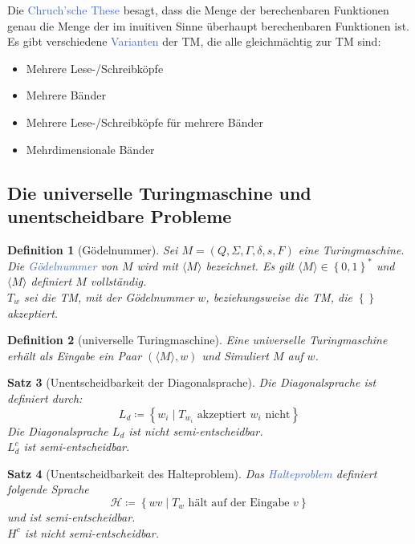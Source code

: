 \documentclass[11pt]{article}
\newcommand{\tcol}[1]{\textcolor{RoyalBlue}{#1}}
\newcommand{\set}[1]{\left\lbrace #1\right\rbrace}
\theoremstyle{break}
\newtheorem{satz}{Satz}[section]
\newtheorem{defi}[satz]{Definition}
\begin{document}
Die \tcol{Chruch'sche These} besagt, dass die Menge der berechenbaren Funktionen genau die Menge der im inuitiven Sinne überhaupt berechenbaren Funktionen ist.\\

Es gibt verschiedene \tcol{Varianten} der TM, die alle gleichmächtig zur TM sind:
\begin{itemize}
\item Mehrere Lese-/Schreibköpfe
\item Mehrere Bänder
\item Mehrere Lese-/Schreibköpfe für mehrere Bänder
\item Mehrdimensionale Bänder
\end{itemize}


\subsection{Die universelle Turingmaschine und unentscheidbare Probleme}

\begin{defi}[Gödelnummer]
Sei $M=(Q,\Sigma,\Gamma,\delta,s,F)$ eine Turingmaschine. Die \tcol{Gödelnummer} von $M$ wird mit $\langle M\rangle$ bezeichnet. Es gilt $\langle M\rangle\in\set{0,1}^*$ und $\langle M\rangle$ definiert $M$ vollständig.\\
$T_w$ sei die TM, mit der Gödelnummer $w$, beziehungsweise die TM, die $\set{}$ akzeptiert.
\end{defi}

\begin{defi}[universelle Turingmaschine]
Eine universelle Turingmaschine erhält als Eingabe ein Paar $(\langle M\rangle,w)$ und Simuliert $M$ auf $w$.
\end{defi}

\begin{satz}[Unentscheidbarkeit der Diagonalsprache]
	Die Diagonalsprache ist definiert durch:
	\[L_d\coloneqq\set{w_i\mid T_{w_i}\text{ akzeptiert }w_i\text{ nicht}}\]
	Die Diagonalsprache $L_d$ ist nicht semi-entscheidbar.\\
	$L_d^c$ ist semi-entscheidbar.
\end{satz}

\begin{satz}[Unentscheidbarkeit des Halteproblem]
Das \tcol{Halteproblem} definiert folgende Sprache
\[\mathcal{H}\coloneqq\set{wv\mid T_w\text{ hält auf der Eingabe }v}\]
und ist semi-entscheidbar.\\
$H^c$ ist nicht semi-entscheidbar.
\end{satz}
\end{document}

